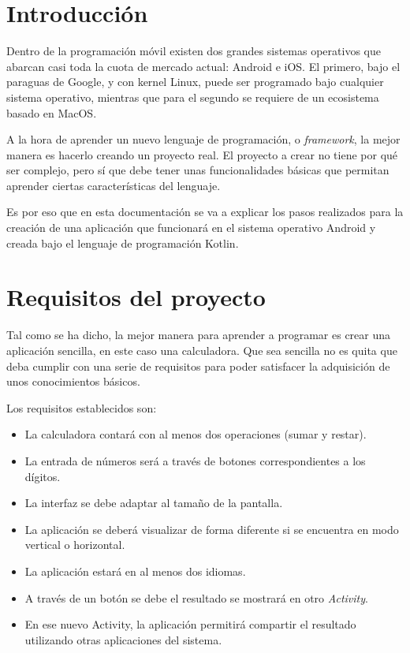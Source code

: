 \documentclass{\ClassPath/viu-tfm-template}
\begin{document}
    \graphicspath{{../../VIU_TFM_LaTeX_template/}}

    \coverpage

    \tableofcontents

\chapter{Introducción}

Dentro de la programación móvil existen dos grandes sistemas operativos que abarcan casi toda la cuota de mercado actual: Android e iOS. El primero, bajo el paraguas de Google, y con kernel Linux, puede ser programado bajo cualquier sistema operativo, mientras que para el segundo se requiere de un ecosistema basado en MacOS.

A la hora de aprender un nuevo lenguaje de programación, o \textit{framework}, la mejor manera es hacerlo creando un proyecto real. El proyecto a crear no tiene por qué ser complejo, pero sí que debe  tener unas funcionalidades básicas que permitan aprender ciertas características del lenguaje.

Es por eso que en esta documentación se va a explicar los pasos realizados para la creación de una aplicación que funcionará en el sistema operativo Android y creada bajo el lenguaje de programación Kotlin.


\chapter{Requisitos del proyecto}

Tal como se ha dicho, la mejor manera para aprender a programar es crear una aplicación sencilla, en este caso una calculadora. Que sea sencilla no es quita que deba cumplir con una serie de requisitos para poder satisfacer la adquisición de unos conocimientos básicos.

Los requisitos establecidos son:

\begin{itemize}
    \item La calculadora contará con al menos dos operaciones (sumar y restar).
    \item La entrada de números será a través de botones correspondientes a los dígitos.
    \item La interfaz se debe adaptar al tamaño de la pantalla.
    \item La aplicación se deberá visualizar de forma diferente si se encuentra en modo vertical o horizontal.
    \item La aplicación estará en al menos dos idiomas.
    \item A través de un botón se debe el resultado se mostrará en otro \textit{Activity}.
    \item En ese nuevo Activity, la aplicación permitirá compartir el resultado utilizando otras aplicaciones del sistema.
\end{itemize}
\end{document}

